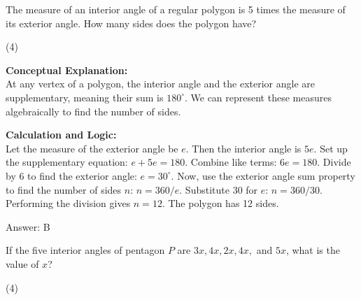 \documentclass[11pt,paper=a4,answers]{exam}
\begin{document}
\begin{questions}
\vspace{60pt}

\question
The measure of an interior angle of a regular polygon is 5 times the measure of its exterior angle. How many sides does the polygon have?
\begin{tasks}(4)
\end{tasks}

\begin{solution}
\textbf{Conceptual Explanation:} \\
At any vertex of a polygon, the interior angle and the exterior angle are supplementary, meaning their sum is $180^\circ$. We can represent these measures algebraically to find the number of sides.

\vspace{30pt}

\textbf{Calculation and Logic:} \\
Let the measure of the exterior angle be $e$. Then the interior angle is $5e$. Set up the supplementary equation: $e + 5e = 180$. Combine like terms: $6e = 180$. Divide by 6 to find the exterior angle: $e = 30^\circ$. Now, use the exterior angle sum property to find the number of sides $n$: $n = 360 / e$. Substitute 30 for $e$: $n = 360 / 30$. Performing the division gives $n = 12$. The polygon has 12 sides.

\vspace{30pt}

Answer: \colorbox{yellow!100}{B}
\end{solution}

\vspace{60pt}

\question
\begin{center}
\end{center}
If the five interior angles of pentagon $P$ are $3x, 4x, 2x, 4x,$ and $5x$, what is the value of $x$?
\begin{tasks}(4)
\end{tasks}


\end{questions}
\end{document}
